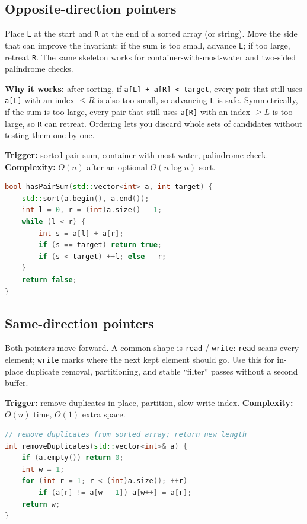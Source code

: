 \subsection{Opposite-direction pointers}
\label{subsec:pat-opp-pointers}
Place \texttt{L} at the start and \texttt{R} at the end of a sorted array (or string).
Move the side that can improve the invariant: if the sum is too small, advance
\texttt{L}; if too large, retreat \texttt{R}. The same skeleton works for
container-with-most-water and two-sided palindrome checks.

\par\noindent\textbf{Why it works:} after sorting, if \texttt{a[L] + a[R] < target},
every pair that still uses \texttt{a[L]} with an index $\le R$ is also too small,
so advancing \texttt{L} is safe. Symmetrically, if the sum is too large, every
pair that still uses \texttt{a[R]} with an index $\ge L$ is too large, so
\texttt{R} can retreat. Ordering lets you discard whole sets of candidates
without testing them one by one.

\textbf{Trigger:} sorted pair sum, container with most water, palindrome check.
\newline
\textbf{Complexity:} $O(n)$ after an optional $O(n\log n)$ sort.

\begin{lstlisting}[language=C++]
bool hasPairSum(std::vector<int> a, int target) {
    std::sort(a.begin(), a.end());
    int l = 0, r = (int)a.size() - 1;
    while (l < r) {
        int s = a[l] + a[r];
        if (s == target) return true;
        if (s < target) ++l; else --r;
    }
    return false;
}
\end{lstlisting}

\subsection{Same-direction pointers}
\label{subsec:pat-same-pointers}
Both pointers move forward. A common shape is \texttt{read} / \texttt{write}:
\texttt{read} scans every element; \texttt{write} marks where the next kept
element should go. Use this for in-place duplicate removal, partitioning, and
stable ``filter'' passes without a second buffer.

\textbf{Trigger:} remove duplicates in place, partition, slow write index.
\newline
\textbf{Complexity:} $O(n)$ time, $O(1)$ extra space.

\begin{lstlisting}[language=C++]
// remove duplicates from sorted array; return new length
int removeDuplicates(std::vector<int>& a) {
    if (a.empty()) return 0;
    int w = 1;
    for (int r = 1; r < (int)a.size(); ++r)
        if (a[r] != a[w - 1]) a[w++] = a[r];
    return w;
}
\end{lstlisting}


